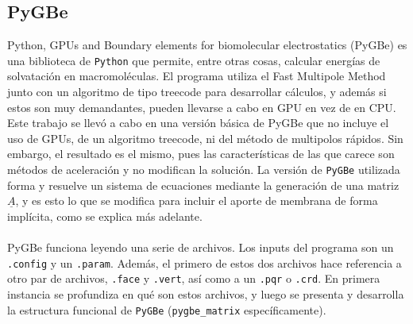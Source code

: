 \documentclass[12pt, oneside, numbers, spanish]{ezthesis}
\numberwithin{equation}{section}
\begin{document}
\subsection{PyGBe}\label{subsec:PyGBe}
Python, GPUs and Boundary elements for biomolecular electrostatics (PyGBe) es una biblioteca de \texttt{Python} que permite, entre otras cosas, calcular energías de solvatación en macromoléculas. El programa utiliza el Fast Multipole Method junto con un algoritmo de tipo treecode para desarrollar cálculos, y además si estos son muy demandantes, pueden llevarse a cabo en GPU en vez de en CPU. Este trabajo se llevó a cabo en una versión básica de PyGBe que no incluye el uso de GPUs, de un algoritmo treecode, ni del método de multipolos rápidos. Sin embargo, el resultado es el mismo, pues las características de las que carece son métodos de aceleración y no modifican la solución. La versión de \texttt{PyGBe} utilizada forma y resuelve un sistema de ecuaciones mediante la generación de una matriz $\underline{A}$, y es esto lo que se modifica para incluir el aporte de membrana de forma implícita, como se explica más adelante.\\\\
PyGBe funciona leyendo una serie de archivos. Los inputs del programa son un \texttt{.config} y un \texttt{.param}. Además, el primero de estos dos archivos hace referencia a otro par de archivos, \texttt{.face} y \texttt{.vert}, así como a un \texttt{.pqr} o \texttt{.crd}. En primera instancia se profundiza en qué son estos archivos, y luego se presenta y desarrolla la estructura funcional de \texttt{PyGBe} (\texttt{pygbe\_matrix} específicamente).
\end{document}
